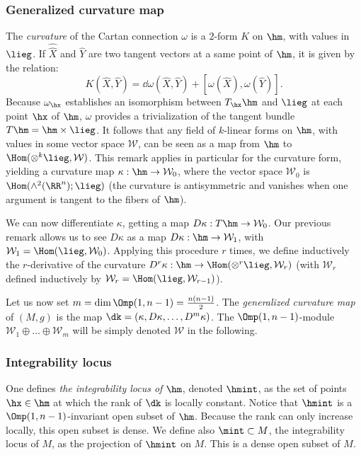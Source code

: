 \subsubsection{Generalized curvature map}\label{sec.generalized.curvature}
The \emph{curvature} of the Cartan connection $\omega$ is a $2$-form $K$ on $\hm$, with values in $\lieg$. If $\hat{\widehat{X}}$ and $\hat{Y}$ are two tangent vectors at a same point of $\hm$, it is given by the relation:
\[
K(\hat{X},\hat{Y})=\dd \omega(\hat{X},\hat{Y}) +[\omega(\hat{X}),\omega(\hat{Y})].
\]
Because $\omega_{\hx}$ establishes an isomorphism between $T_{\hx}\hm$ and $\lieg$ at each point $\hx$ of $\hm$, $\omega$ provides a trivialization of the tangent bundle $T\hm=\hm \times \lieg$. It follows that any field of $k$-linear forms on $\hm$, with values in some vector space ${\mathcal W}$, can be seen as a map from $\hm$ to $ \Hom(\otimes^k \lieg,{\mathcal W})$. This remark applies in particular for the curvature form, yielding a curvature map $\kappa: \hm \to {\mathcal W}_0$, where the vector space ${\mathcal W}_0$ is $\Hom(\wedge^2(\RR^n);\lieg)$ (the curvature is antisymmetric and vanishes when one argument is tangent to the fibers of $\hm$).

We can now differentiate $\kappa$, getting a map $D \kappa : T\hm \to {\mathcal W}_0$. Our previous remark allows us to see $D\kappa$ as a map $D \kappa : \hm \to {\mathcal W}_1$, with ${\mathcal W}_1=\Hom(\lieg,{\mathcal W}_0)$. Applying this procedure $r$ times, we define inductively the $r$-derivative of the curvature $D^r \kappa : \hm \to \Hom(\otimes^r \lieg,{\mathcal W}_r)$ (with ${\mathcal W}_r$ defined inductively by ${\mathcal W}_r=\Hom(\lieg, {\mathcal W}_{r-1})$).

Let us now set $m = \dim \Omp(1,n-1)=\frac{n(n-1)}{2}$. The \emph{generalized curvature map} of $(M, g)$ is the map $\dk =(\kappa,D\kappa, \ldots,D^{m}\kappa)$. The $\Omp(1,n-1)$-module ${\mathcal W}_{1} \oplus \ldots \oplus {\mathcal W}_{m}$ will be simply denoted ${\mathcal W}$ in the following.



\subsubsection{Integrability locus}\label{sec.integrability.locus}
One defines \emph{the integrability locus of $\hm$}, denoted $\hmint$, as the set of points $\hx \in \hm$ at which the rank of $ \dk$ is locally constant. Notice that $ \hmint$ is a $\Omp(1,n-1)$-invariant open subset of $\hm$. Because the rank can only increase locally, this open subset is dense. We define also $ \mint \subset M$, the integrability locus of $M$, as the projection of $\hmint$ on $M$. This is a dense open subset of $M$.



